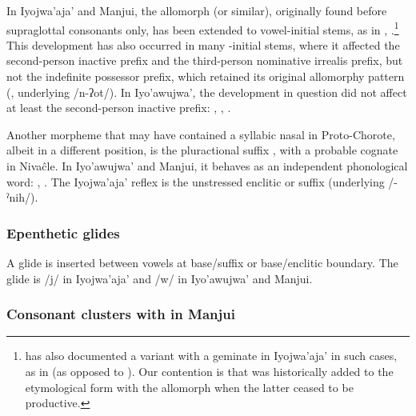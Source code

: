 In Iyojwa’aja’ and Manjui, the allomorph  (or similar), originally found before supraglottal consonants only, has been extended to vowel-initial stems, as in , .\footnote{\citet{JC14a} has also documented a variant with a geminate  in Iyojwa’aja’ in such cases, as in  (as opposed to ). Our contention is that  was historically added to the etymological form with the allomorph  when the latter ceased to be productive.} This development has also occurred in many \mbox{-}initial stems, where it affected the second-person inactive prefix and the third-person nominative irrealis prefix, but not the indefinite possessor prefix, which retained its original allomorphy pattern (, underlying /n\mbox{-}ʔot/). In Iyo’awujwa’, the development in question did not affect at least the second-person inactive prefix: , ,  \citep[77]{AG83}.

Another morpheme that may have contained a syllabic nasal in Proto-Chorote, albeit in a different position, is the pluractional suffix , with a probable cognate in Nivaĉle. In Iyo’awujwa’ and Manjui, it behaves as an independent phonological word: , . The Iyojwa’aja’ reflex is the unstressed enclitic or suffix  (underlying /\mbox{-}ˀnih/).

\subsubsection{Epenthetic glides}

A glide is inserted between vowels at base/suffix or base/enclitic boundary. The glide is /j/ in Iyojwa'aja' and /w/ in Iyo'awujwa' and Manjui.

\begin{exe}
    \ex {}
    \ex {}
    \ex {}
\end{exe}

\subsubsection{Consonant clusters with  in Manjui}

